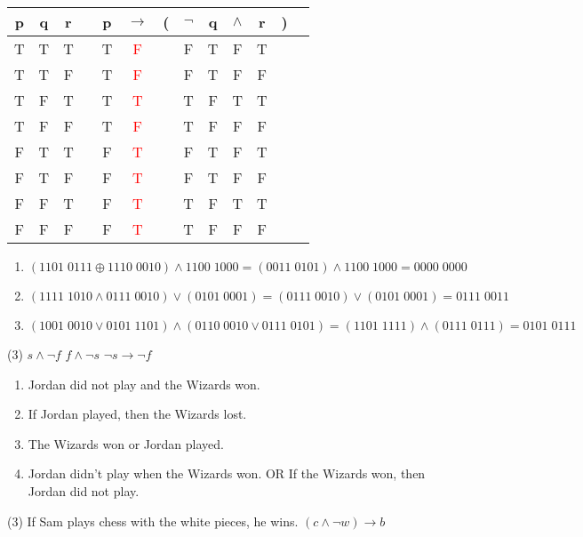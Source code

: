 \begin{Solution}{1.2}
\begin{tasks}
  \task
      \begin{tabular}{@{ }c@{ }@{ }c@{ }@{ }c | c@{ }@{ }c@{ }@{ }c@{ }@{}c@{}@{ }c@{ }@{ }c@{ }@{ }c@{ }@{ }c@{ }@{}c@{}@{ }c}
	p & q & r &  & p & $\rightarrow$ & ( & $\lnot $ & q & $\land$ & r & ) & \\
	\hline
	T & T & T &  & T & \textcolor{red}{F} &  & F & T & F & T &  & \\
	T & T & F &  & T & \textcolor{red}{F} &  & F & T & F & F &  & \\
	T & F & T &  & T & \textcolor{red}{T} &  & T & F & T & T &  & \\
	T & F & F &  & T & \textcolor{red}{F} &  & T & F & F & F &  & \\
	F & T & T &  & F & \textcolor{red}{T} &  & F & T & F & T &  & \\
	F & T & F &  & F & \textcolor{red}{T} &  & F & T & F & F &  & \\
	F & F & T &  & F & \textcolor{red}{T} &  & T & F & T & T &  & \\
	F & F & F &  & F & \textcolor{red}{T} &  & T & F & F & F &  & \\
      \end{tabular}
   \end{tasks}
 
\end{Solution}
\begin{Solution}{1.3}
\quad\begin{fullwidth}
 \begin{enumerate}[label=\alph*),labelindent=0.25cm,leftmargin=*]
  \item $(1101\; 0111 \oplus 1110 \; 0010)\land 1100\; 1000=(0011\; 0101)\land 1100\; 1000=0000\; 0000$
  \item $(1111\; 1010\land 0111\; 0010)\lor (0101\; 0001)=(0111\; 0010)\lor (0101\; 0001)=0111\; 0011$
  \item $(1001\; 0010 \lor 0101\; 1101)\land (0110\;0010\lor 0111\; 0101)=(1101\; 1111)\land (0111\; 0111)=0101\;0111$
 \end{enumerate}
 \end{fullwidth}
\end{Solution}
\begin{Solution}{1.4}
\quad
    \begin{tasks}(3)
        \task $s \land \lnot f$
         \task $f \land \lnot s$
        \task $ \lnot s \to \lnot f$
    \end{tasks}
\end{Solution}
\begin{Solution}{1.5}
\quad
 \begin{enumerate}[label=\alph*),labelindent=0.25cm,leftmargin=*]
  \item Jordan did not play and the Wizards won.
  \item If Jordan played, then the Wizards lost.
  \item The Wizards won or Jordan played.
  \item Jordan didn't play when the Wizards won.
        OR If the   Wizards won, then Jordan did not play.
 \end{enumerate}
\end{Solution}
\begin{Solution}{1.6}
\quad
  \begin{tasks}(3)
       \task If Sam plays chess with the white pieces, he wins.
       \task  $(c\land \lnot w)\to b$
  \end{tasks}
\end{Solution}
